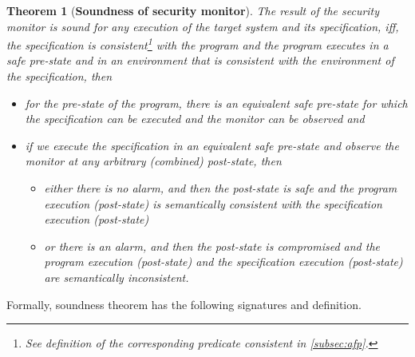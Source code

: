 \documentclass[conference]{IEEEtran}
\newtheorem{thm}{Theorem}
\begin{document}
\begin{thm}[\textbf{Soundness of security monitor}]\label{soundness} 
The result of the security monitor is sound for any execution of the target system and its specification, iff, the specification is consistent\footnote[4]{See definition of the corresponding predicate \emph{consistent} in \cref{subsec:afp}.} with the program and the program executes in a safe pre-state and in an environment that is consistent with the environment of the specification, then \begin{itemize}
\item for the pre-state of the program, there is an equivalent safe pre-state for which the specification can be executed and the monitor can be observed and
\item if we execute the specification in an equivalent safe pre-state and observe the monitor at any arbitrary (combined) post-state, then 
\begin{itemize}
\item either there is no alarm, and then the post-state is safe and the program execution (post-state) is semantically consistent with the specification execution (post-state)
\item or there is an alarm, and then the post-state is compromised and the program execution (post-state) and the specification execution (post-state) are semantically inconsistent.
\end{itemize} 
\end{itemize}
\end{thm}


Formally, soundness theorem has the following signatures and definition.
\end{document}
